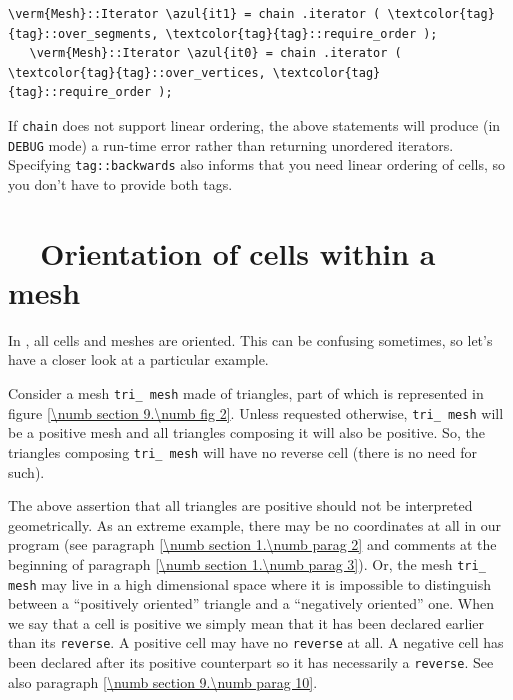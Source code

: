 \begin{Verbatim}[commandchars=\\\{\},formatcom=\small\tt,
   baselinestretch=0.94,framesep=2mm                      ]
   \verm{Mesh}::Iterator \azul{it1} = chain .iterator ( \textcolor{tag}{tag}::over_segments, \textcolor{tag}{tag}::require_order );
   \verm{Mesh}::Iterator \azul{it0} = chain .iterator ( \textcolor{tag}{tag}::over_vertices, \textcolor{tag}{tag}::require_order );
\end{Verbatim}

If {\small\tt chain} does not support linear ordering, the above statements will produce
(in {\small\tt DEBUG} mode) a run-time error rather than returning unordered iterators.
Specifying {\small\tt\textcolor{tag}{tag}::backwards} also informs {\maniFEM} that you need
linear ordering of cells, so you don't have to provide both tags.


\section{~~Orientation of cells within a mesh}\label{\numb section 9.\numb parag 5}

In \maniFEM, all cells and meshes are oriented.
This can be confusing sometimes, so let's have a closer look at a particular example.

Consider a mesh {\small\tt tri\_\,mesh} made of triangles, part of which is represented
in figure \ref{\numb section 9.\numb fig 2}.
Unless requested otherwise, {\small\tt tri\_\,mesh} will be a positive mesh and all triangles
composing it will also be positive.
So, the triangles composing {\small\tt tri\_\,mesh} will have no reverse cell
(there is no need for such).

The above assertion that all triangles are positive should not be interpreted geometrically.
As an extreme example, there may be no coordinates at all in our program
(see paragraph \ref{\numb section 1.\numb parag 2} and comments at the beginning of paragraph
\ref{\numb section 1.\numb parag 3}).
Or, the mesh {\small\tt tri\_\,mesh} may live in a high dimensional space where it is
impossible to distinguish between a ``positively oriented'' triangle and a ``negatively
oriented'' one.
When we say that a cell is positive we simply mean that it has been declared earlier than
its {\small\tt reverse}.
A positive cell may have no {\small\tt reverse} at all.
A negative cell has been declared after its positive counterpart so it has necessarily a
{\small\tt reverse}.
See also paragraph \ref{\numb section 9.\numb parag 10}.

